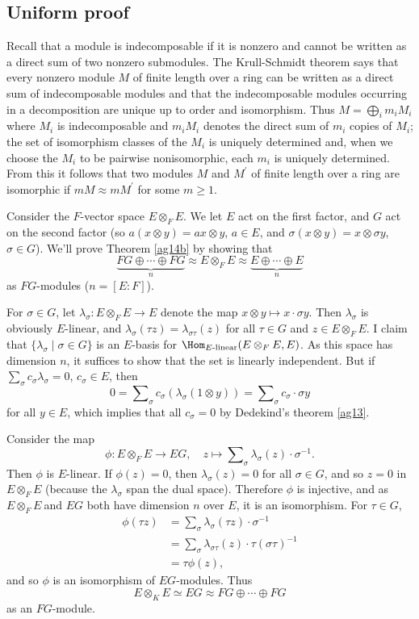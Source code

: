 \documentclass[a4paper,11pt,final,openany]{memoir}
\theoremstyle{nonumberplain}
\begin{document}
\subsection{Uniform proof}

Recall that a module is indecomposable if it is nonzero and cannot be written
as a direct sum of two nonzero submodules. The Krull-Schmidt theorem says that
every nonzero module $M$ of finite length over a ring can be written as a
direct sum of indecomposable modules and that the indecomposable modules
occurring in a decomposition are unique up to order and isomorphism. Thus
$M=\bigoplus_{i}m_{i}M_{i}$ where $M_{i}$ is indecomposable and $m_{i}M_{i}$
denotes the direct sum of $m_{i}$ copies of $M_{i}$; the set of isomorphism
classes of the $M_{i}$ is uniquely determined and, when we choose the $M_{i}$
to be pairwise nonisomorphic, each $m_{i}$ is uniquely determined. From this
it follows that two modules $M$ and $M^{\prime}$ of finite length over a ring
are isomorphic if $mM\approx mM^{\prime}$ for some $m\geq1$.

Consider the $F$-vector space $E\otimes_{F}E$. We let $E$ act on the first
factor, and $G$ act on the second factor (so $a(x\otimes y)=ax\otimes y$,
$a\in E$, and $\sigma(x\otimes y)=x\otimes\sigma y$, $\sigma\in G$). We'll
prove Theorem \ref{ag14b} by showing that%
\[
\underbrace{FG\oplus\cdots\oplus FG}_{n}\approx E\otimes_{F}E\approx
\underbrace{E\oplus\cdots\oplus E}_{n}%
\]
as $FG$-modules ($n=[E\colon F]$).

For $\sigma\in G$, let $\lambda_{\sigma}\colon E\otimes_{F}E\rightarrow E$
denote the map $x\otimes y\mapsto x\cdot\sigma y$. Then $\lambda_{\sigma}$ is
obviously $E$-linear, and $\lambda_{\sigma}(\tau z)=\lambda_{\sigma\tau}(z)$
for all $\tau\in G$ and $z\in E\otimes_{F}E$. I claim that $\{\lambda_{\sigma
}\mid\sigma\in G\}$ is an $E$-basis for $\Hom_{E\text{-linear}}(E\otimes
_{F}E,E)$. As this space has dimension $n$, it suffices to show that the set
is linearly independent. But if $\sum_{\sigma}c_{\sigma}\lambda_{\sigma}=0$,
$c_{\sigma}\in E$, then%
\[
0=\sum\nolimits_{\sigma}c_{\sigma}(\lambda_{\sigma}(1\otimes y))=\sum
\nolimits_{\sigma}c_{\sigma}\cdot\sigma y
\]
for all $y\in E$, which implies that all $c_{\sigma}=0$ by Dedekind's theorem
\ref{ag13}.

Consider the map%
\[
\phi\colon E\otimes_{F}E\rightarrow EG,\quad z\mapsto\sum\nolimits_{\sigma
}\lambda_{\sigma}(z)\cdot\sigma^{-1}.
\]
Then $\phi$ is $E$-linear. If $\phi(z)=0$, then $\lambda_{\sigma}(z)=0$ for
all $\sigma\in G$, and so $z=0$ in $E\otimes_{F}E$ (because the $\lambda
_{\sigma}$ span the dual space). Therefore $\phi$ is injective, and as
$E\otimes_{F}E\ $and $EG$ both have dimension $n$ over $E$, it is an
isomorphism. For $\tau\in G$,%
\begin{align*}
\phi(\tau z)  &  =\sum\nolimits_{\sigma}\lambda_{\sigma}(\tau z)\cdot
\sigma^{-1}\\
&  =\sum\nolimits_{\sigma}\lambda_{\sigma\tau}(z)\cdot\tau(\sigma\tau)^{-1}\\
&  =\tau\phi(z),
\end{align*}
and so $\phi$ is an isomorphism of $EG$-modules. Thus%
\[
E\otimes_{K}E\simeq EG\approx FG\oplus\cdots\oplus FG
\]
as an $FG$-module.
\end{document}
